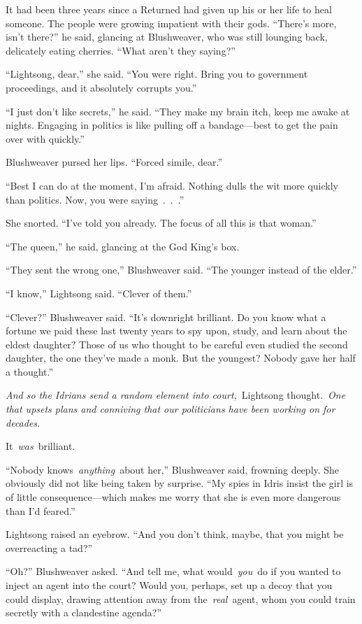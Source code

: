 It had been three years since a Returned had given up his or her life to heal someone. The people were growing impatient with their gods. “There’s more, isn’t there?” he said, glancing at Blushweaver, who was still lounging back, delicately eating cherries. “What aren’t they saying?”

“Lightsong, dear,” she said. “You were right. Bring you to government proceedings, and it absolutely corrupts you.”

“I just don’t like secrets,” he said. “They make my brain itch, keep me awake at nights. Engaging in politics is like pulling off a bandage—best to get the pain over with quickly.”

Blushweaver pursed her lips. “Forced simile, dear.”

“Best I can do at the moment, I’m afraid. Nothing dulls the wit more quickly than politics. Now, you were saying~.~.~.”

She snorted. “I’ve told you already. The focus of all this is that woman.”

“The queen,” he said, glancing at the God King’s box.

“They sent the wrong one,” Blushweaver said. “The younger instead of the elder.”

“I know,” Lightsong said. “Clever of them.”

“Clever?” Blushweaver said. “It’s downright brilliant. Do you know what a fortune we paid these last twenty years to spy upon, study, and learn about the eldest daughter? Those of us who thought to be careful even studied the second daughter, the one they’ve made a monk. But the youngest? Nobody gave her half a thought.”

\textit{And so the Idrians send a random element into court,}~Lightsong thought.~\textit{One that upsets plans and conniving that our politicians have been working on for decades.}

It~\textit{was}~brilliant.

“Nobody knows~\textit{anything}~about her,” Blushweaver said, frowning deeply. She obviously did not like being taken by surprise. “My spies in Idris insist the girl is of little consequence—which makes me worry that she is even more dangerous than I’d feared.”

Lightsong raised an eyebrow. “And you don’t think, maybe, that you might be overreacting a tad?”

“Oh?” Blushweaver asked. “And tell me, what would~\textit{you}~do if you wanted to inject an agent into the court? Would you, perhaps, set up a decoy that you could display, drawing attention away from the~\textit{real}~agent, whom you could train secretly with a clandestine agenda?”

